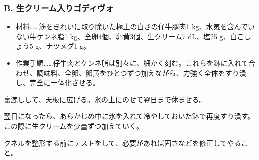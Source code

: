\begin{recette}
\hypertarget{godiveau-a-la-creme}{%
\subsubsection{B. 生クリーム入りゴディヴォ}\label{godiveau-a-la-creme}}



\begin{itemize}
\item
  材料\ldots{}\ldots{}筋をきれいに取り除いた極上の白さの仔牛腿肉1
  kg、水気を含んでいない牛ケンネ脂1 kg、全卵4個、卵黄3個、生クリーム7
  dL、塩25 g、白こしょう5 g、ナツメグ1 g。
\item
  作業手順\ldots{}\ldots{}仔牛肉とケンネ脂は別々に、細かく刻む。これらを鉢に入れて合わせ、調味料、全卵、卵黄をひとつずつ加えながら、力強く全体をすり潰し、完全に一体化させる。
\end{itemize}

裏漉しして、天板に広げる。氷の上にのせて翌日まで休ませる。

翌日になったら、あらかじめ中に氷を入れて冷やしておいた鉢で再度すり潰す。この際に生クリームを少量ずつ加えていく。

クネルを整形する前にテストをして、必要があれば固さなどを修正してやること。

\atoaki{}

\hypertarget{godiveau-lyonnais}{%
}
\end{recette}
